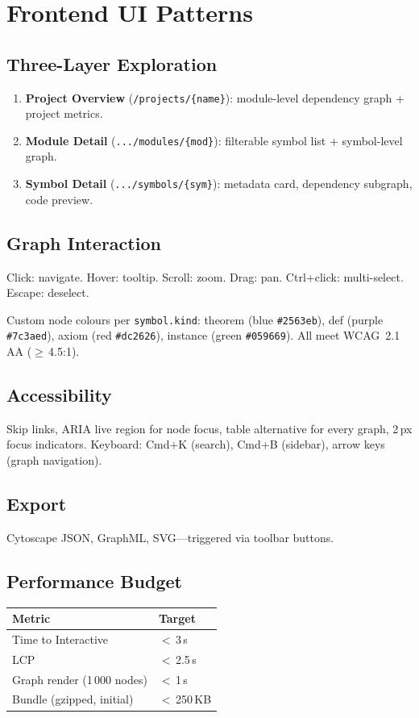 \chapter{Frontend UI Patterns}

\section{Three-Layer Exploration}
\begin{enumerate}
  \item \textbf{Project Overview} (\texttt{/projects/\{name\}}):
        module-level dependency graph + project metrics.
  \item \textbf{Module Detail} (\texttt{.../modules/\{mod\}}):
        filterable symbol list + symbol-level graph.
  \item \textbf{Symbol Detail} (\texttt{.../symbols/\{sym\}}):
        metadata card, dependency subgraph, code preview.
\end{enumerate}

\section{Graph Interaction}
Click: navigate.  Hover: tooltip.  Scroll: zoom.  Drag: pan.
Ctrl+click: multi-select.  Escape: deselect.

Custom node colours per \texttt{symbol.kind}: theorem (blue \texttt{\#2563eb}),
def (purple \texttt{\#7c3aed}), axiom (red \texttt{\#dc2626}),
instance (green \texttt{\#059669}).  All meet WCAG~2.1 AA ($\geq$\,4.5:1).

\section{Accessibility}
Skip links, ARIA live region for node focus, table alternative for every
graph, 2\,px focus indicators.  Keyboard: Cmd+K (search), Cmd+B (sidebar),
arrow keys (graph navigation).

\section{Export}
Cytoscape JSON, GraphML, SVG---triggered via toolbar buttons.

\section{Performance Budget}
\begin{table}[h]
\centering
\begin{tabular}{@{}ll@{}}
\toprule
\textbf{Metric} & \textbf{Target} \\
\midrule
Time to Interactive & $<$\,3\,s \\
LCP & $<$\,2.5\,s \\
Graph render (1\,000 nodes) & $<$\,1\,s \\
Bundle (gzipped, initial) & $<$\,250\,KB \\
\bottomrule
\end{tabular}
\end{table}
